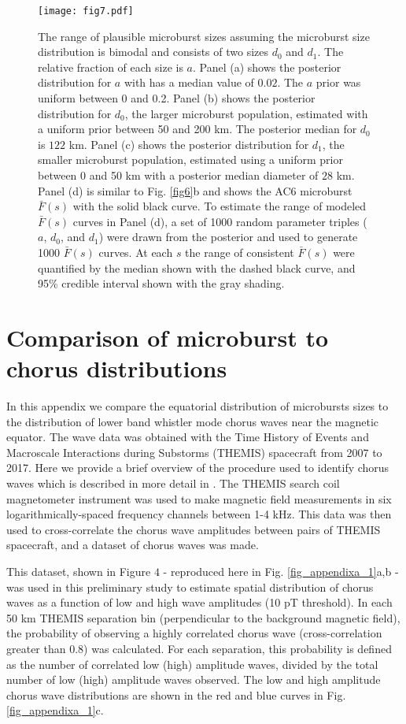 \documentclass[draft]{agujournal2019}
\begin{document}
\begin{figure}
\texttt{[image: fig7.pdf]}
\caption{The range of plausible microburst sizes assuming the microburst size distribution is bimodal and consists of two sizes $d_0$ and $d_1$. The relative fraction of each size is $a$. Panel (a) shows the posterior distribution for $a$ with has a median value of $0.02$. The $a$ prior was uniform between 0 and 0.2. Panel (b) shows the posterior distribution for $d_0$, the larger microburst population, estimated with a uniform prior between 50 and 200 km. The posterior median for $d_0$ is $122$ km. Panel (c) shows the posterior distribution for $d_1$, the smaller microburst population, estimated using a uniform prior between 0 and 50 km with a posterior median diameter of $28$ km. Panel (d) is similar to Fig. \ref{fig6}b and shows the AC6 microburst $\bar{F}(s)$ with the solid black curve. To estimate the range of modeled $\bar{F}(s)$ curves in Panel (d), a set of 1000 random parameter triples ($a$, $d_0$, and $d_1$) were drawn from the posterior and used to generate 1000 $\bar{F}(s)$ curves. At each $s$ the range of consistent $\bar{F}(s)$ were quantified by the median shown with the dashed black curve, and 95\% credible interval shown with the gray shading.} 
\label{fig7}
\end{figure}

\appendix

\section{Comparison of microburst to chorus distributions} \label{appendixa}
In this appendix we compare the equatorial distribution of microbursts sizes to the distribution of lower band whistler mode chorus waves near the magnetic equator. The wave data was obtained with the Time History of Events and Macroscale Interactions during Substorms (THEMIS) spacecraft from 2007 to 2017. Here we provide a brief overview of the procedure used to identify chorus waves which is described in more detail in . The THEMIS search coil magnetometer instrument was used to make magnetic field measurements in six logarithmically-spaced frequency channels between 1-4 kHz. This data was then used to cross-correlate the chorus wave amplitudes between pairs of THEMIS spacecraft, and a dataset of chorus waves was made.

This dataset, shown in  Figure $4$ - reproduced here in Fig. \ref{fig_appendixa_1}a,b - was used in this preliminary study to estimate spatial distribution of chorus waves as a function of low and high wave amplitudes (10 pT threshold). In each 50 km THEMIS separation bin (perpendicular to the background magnetic field), the probability of observing a highly correlated chorus wave (cross-correlation greater than 0.8) was calculated. For each separation, this probability is defined as the number of correlated low (high) amplitude waves, divided by the total number of low (high) amplitude waves observed. The low and high amplitude chorus wave distributions are shown in the red and blue curves in  Fig. \ref{fig_appendixa_1}c.
\end{document}
